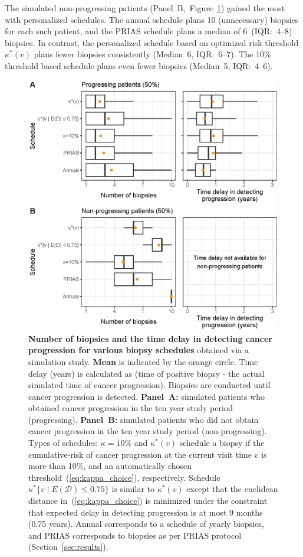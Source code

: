 The simulated non-progressing patients (Panel~B,~Figure~\ref{fig:simulation_boxplot}) gained the most with personalized schedules. The annual schedule plans 10 (unnecessary) biopsies for each such patient, and the PRIAS schedule plans a median of 6~(IQR:~4--8) biopsies. In contrast, the personalized schedule based on optimized risk threshold $\kappa^*(v)$ plans fewer biopsies consistently (Median~6, IQR:~6--7). The 10\% threshold based schedule plans even fewer biopsies (Median~5, IQR:~4--6).

\begin{figure}
\centerline{\includegraphics{images/simulation_boxplot.eps}}
\caption{\textbf{Number of biopsies and the time delay in detecting cancer progression for various biopsy schedules} obtained via a simulation study. \textbf{Mean} is indicated by the orange circle. Time delay (years) is calculated as (time of positive biopsy - the actual simulated time of cancer progression). Biopsies are conducted until cancer progression is detected. \textbf{Panel~A:} simulated patients who obtained cancer progression in the ten year study period (progressing). \textbf{Panel~B:} simulated patients who did not obtain cancer progression in the ten year study period (non-progressing). Types of schedules: ${\kappa=10\%}$ and $\kappa^*(v)$ schedule a biopsy if the cumulative-risk of cancer progression at the current visit time $v$ is more than 10\%, and an automatically chosen threshold~(\ref{eq:kappa_choice}), respectively. Schedule ${\kappa^*\{v \mid E(\mathcal{D})\leq 0.75\}}$ is similar to $\kappa^*(v)$ except that the euclidean distance in~(\ref{eq:kappa_choice}) is minimized under the constraint that expected delay in detecting progression is at most 9 months (0.75 years). Annual corresponds to a schedule of yearly biopsies, and PRIAS corresponds to biopsies as per PRIAS protocol (Section~\ref{sec:results}).}
\label{fig:simulation_boxplot}
\end{figure}
